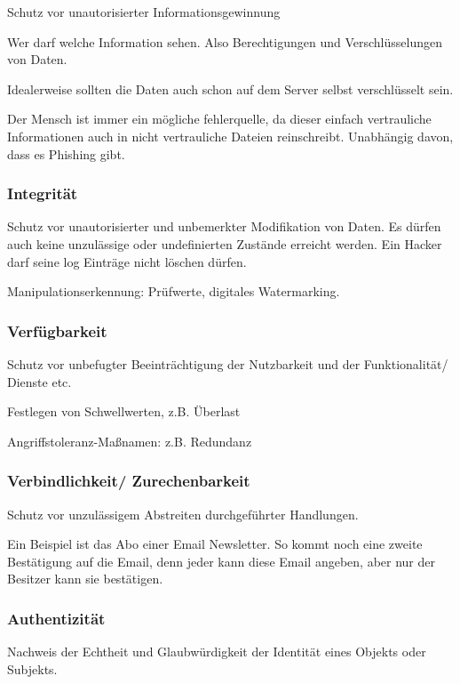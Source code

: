 \documentclass[a4paper]{article}
\begin{document}
Schutz vor unautorisierter Informationsgewinnung

Wer darf welche Information sehen. Also Berechtigungen und Verschlüsselungen von Daten.

Idealerweise sollten die Daten auch schon auf dem Server selbst verschlüsselt sein.

Der Mensch ist immer ein mögliche fehlerquelle, da dieser einfach vertrauliche Informationen auch in nicht vertrauliche Dateien reinschreibt. Unabhängig davon, dass es Phishing gibt.

\subsubsection{Integrität}

Schutz vor unautorisierter und unbemerkter Modifikation von Daten. Es dürfen auch keine unzulässige oder undefinierten Zustände erreicht werden. Ein Hacker darf seine log Einträge nicht löschen dürfen.

Manipulationserkennung: Prüfwerte, digitales Watermarking.

\subsubsection{Verfügbarkeit}

Schutz vor unbefugter Beeinträchtigung der Nutzbarkeit und der Funktionalität/ Dienste etc.

Festlegen von Schwellwerten, z.B. Überlast

Angriffstoleranz-Maßnamen: z.B. Redundanz

\subsubsection{Verbindlichkeit/ Zurechenbarkeit}

Schutz vor unzulässigem Abstreiten durchgeführter Handlungen.

Ein Beispiel ist das Abo einer Email Newsletter. So kommt noch eine zweite Bestätigung auf die Email, denn jeder kann diese Email angeben, aber nur der Besitzer kann sie bestätigen.

\subsubsection{Authentizität}

Nachweis der Echtheit und Glaubwürdigkeit der Identität eines Objekts oder Subjekts.
\end{document}

